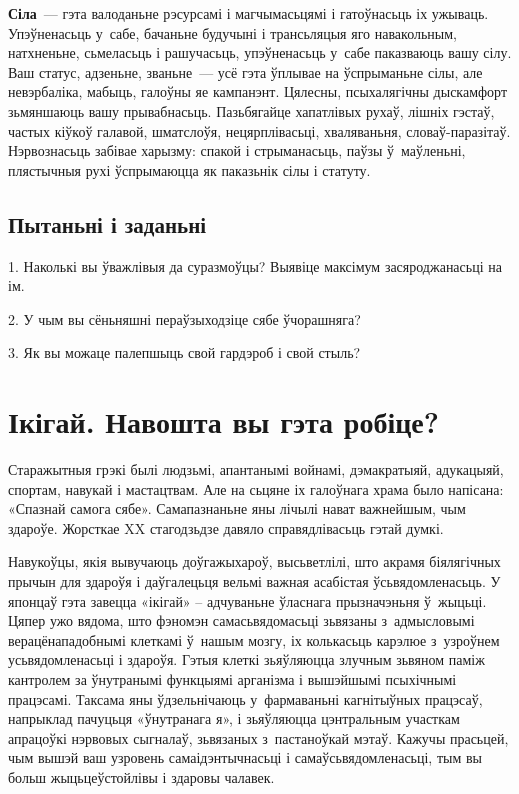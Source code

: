 \textbf{Сіла}~--- гэта валоданьне рэсурсамі і магчымасьцямі і гатоўнасьць іх ужываць. Упэўненасьць у~сабе, бачаньне будучыні і трансьляцыя яго навакольным, натхненьне, сьмеласьць і рашучасьць, упэўненасьць у~сабе паказваюць вашу сілу. Ваш статус, адзеньне, званьне~--- усё гэта ўплывае на ўспрыманьне сілы, але невэрбаліка, мабыць, галоўны яе кампанэнт. Цялесны, псыхалягічны дыскамфорт зьмяншаюць вашу прывабнасьць. Пазьбягайце хапатлівых рухаў, лішніх гэстаў, частых кіўкоў галавой, шматслоўя, нецярплівасьці, хваляваньня, словаў-паразітаў. Нэрвознасьць забівае харызму: спакой і стрыманасьць, паўзы ў~маўленьні, плястычныя рухі ўспрымаюцца як паказьнік сілы і статуту.

\subsection*{Пытаньні і заданьні}

1. Наколькі вы ўважлівыя да суразмоўцы? Выявіце максімум засяроджанасьці на ім.

2. У чым вы сёньняшні пераўзыходзіце сябе ўчорашняга?

3. Як вы можаце палепшыць свой гардэроб і свой стыль?


\section{Ікігай. Навошта вы гэта робіце?}

Старажытныя грэкі былі людзьмі, апантанымі войнамі, дэмакратыяй, адукацыяй, спортам, навукай і мастацтвам. Але на сьцяне іх галоўнага храма было напісана: «Спазнай самога сябе». Самапазнаньне яны лічылі нават важнейшым, чым здароўе. Жорсткае XX стагодзьдзе давяло справядлівасьць гэтай думкі.


Навукоўцы, якія вывучаюць доўгажыхароў, высьветлілі, што акрамя біялягічных прычын для здароўя і даўгалецьця вельмі важная асабістая ўсьвядомленасьць. У японцаў гэта завецца «ікігай» -- адчуваньне ўласнага прызначэньня ў~жыцьці. Цяпер ужо вядома, што фэномэн самасьвядомасьці зьвязаны з~адмысловымі верацёнападобнымі клеткамі ў~нашым мозгу, іх колькасьць карэлюе з~узроўнем усьвядомленасьці і здароўя. Гэтыя клеткі зьяўляюцца злучным зьвяном паміж кантролем за ўнутранымі функцыямі арганізма і вышэйшымі псыхічнымі працэсамі. Таксама яны ўдзельнічаюць у~фармаваньні кагнітыўных працэсаў, напрыклад пачуцьця «ўнутранага я», і зьяўляюцца цэнтральным участкам апрацоўкі нэрвовых сыгналаў, зьвязаных з~пастаноўкай мэтаў. Кажучы прасьцей, чым вышэй ваш узровень самаідэнтычнасьці і самаўсьвядомленасьці, тым вы больш жыцьцеўстойлівы і здаровы чалавек.

